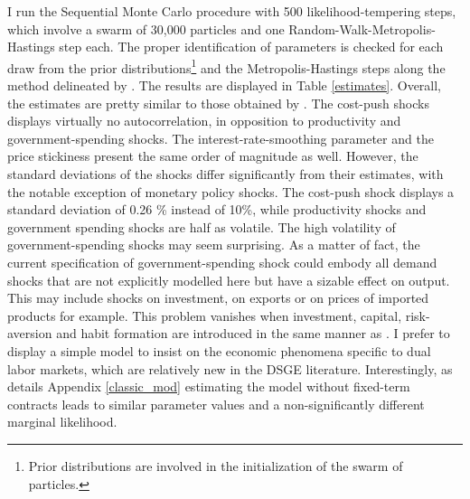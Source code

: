 I run the Sequential Monte Carlo procedure with 500 likelihood-tempering steps, which involve a swarm of 30,000 particles and one Random-Walk-Metropolis-Hastings step each. The proper identification of parameters is checked for each draw from the prior distributions\footnote{Prior distributions are involved in the initialization of the swarm of particles.} and the Metropolis-Hastings steps along the method delineated by \citet{ISKREV2010189}. The results are displayed in Table \ref{estimates}. Overall, the estimates are pretty similar to those obtained by \citet{thomas2009labor}. The cost-push shocks displays virtually no autocorrelation, in opposition to productivity and government-spending shocks. The interest-rate-smoothing parameter and the price stickiness present the same order of magnitude as well. However, the standard deviations of the shocks differ significantly from their estimates, with the notable exception of monetary policy shocks. The cost-push shock displays a standard deviation of 0.26 \% instead of 10\%, while productivity shocks and government spending shocks are half as volatile. The high volatility of government-spending shocks may seem surprising. As a matter of fact, the current specification of government-spending shock could embody all demand shocks that are not explicitly modelled here but have a sizable effect on output. This may include shocks on investment, on exports or on prices of imported products for example. This problem vanishes when investment, capital, risk-aversion and habit formation are introduced in the same manner as \citet{doi:10.1111/j.1538-4616.2008.00180.x}. I prefer to display a simple model to insist on the economic phenomena specific to dual labor markets, which are relatively new in the DSGE literature. Interestingly, as details Appendix \ref{classic_mod} estimating the model without fixed-term contracts leads to similar parameter values and a non-significantly different marginal likelihood.